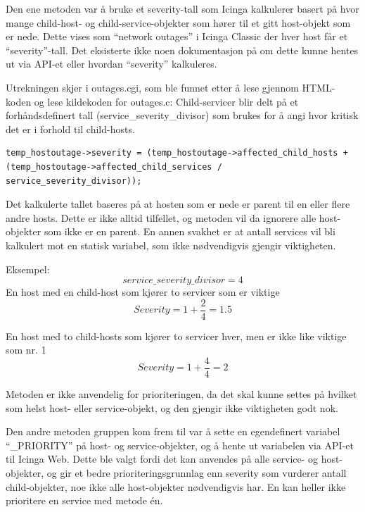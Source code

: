 Den ene metoden var å bruke et severity-tall som Icinga kalkulerer basert på hvor mange child-host- og child-service-objekter som hører til et gitt host-objekt som er nede. Dette vises som ``network outages'' i Icinga Classic der hver host får et ``severity''-tall. Det eksisterte ikke noen dokumentasjon på om dette kunne hentes ut via API-et eller hvordan ``severity'' kalkuleres. 

Utrekningen skjer i outages.cgi, som ble funnet etter å lese gjennom HTML-koden og lese kildekoden for outages.c\cite{dnsmichi}:
Child-servicer blir delt på et forhåndsdefinert tall (service\_severity\_divisor) som brukes for å angi hvor kritisk det er i forhold til child-hosts.

\begin{lstlisting}[style=example]
temp_hostoutage->severity = (temp_hostoutage->affected_child_hosts + (temp_hostoutage->affected_child_services / service_severity_divisor));
\end{lstlisting}

Det kalkulerte tallet baseres på at hosten som er nede er parent til en eller flere andre hosts. Dette er ikke alltid tilfellet, og metoden vil da ignorere alle host-objekter som ikke er en parent. En annen svakhet er at antall services vil bli kalkulert mot en statisk variabel, som ikke nødvendigvis gjengir viktigheten.

Eksempel:
\begin{equation}
service\_severity\_divisor = 4 
\end{equation}
En host med en child-host som kjører to servicer som er viktige
\begin{equation}
Severity = 1 + \frac{2}{4} = 1.5
\end{equation}

En host med to child-hosts som kjører to servicer hver, men er ikke like viktige som nr. 1
\begin{equation}
Severity = 1 + \frac{4}{4} = 2
\end{equation}

Metoden er ikke anvendelig for prioriteringen, da det skal kunne settes på hvilket som helst host- eller service-objekt, og den gjengir ikke viktigheten godt nok.     

Den andre metoden gruppen kom frem til var å sette en egendefinert variabel ``\_PRIORITY'' på host- og service-objekter, og å hente ut variabelen via API-et til Icinga Web. Dette ble valgt fordi det kan anvendes på alle service- og host-objekter, og gir et bedre prioriteringsgrunnlag enn severity som vurderer antall child-objekter, noe ikke alle host-objekter nødvendigvis har. En kan heller ikke prioritere en service med metode én.

